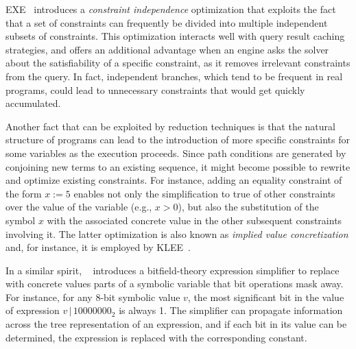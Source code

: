 {\sc EXE}~\cite{EXE-CCS06} introduces a {\em constraint independence} optimization that exploits the fact that a set of constraints can frequently be divided into multiple independent subsets of constraints. This optimization interacts well with query result caching strategies, and offers an additional advantage when an engine asks the solver about the satisfiability of a specific constraint, as it removes irrelevant constraints from the query. In fact, independent branches, which tend to be frequent in real programs, could lead to unnecessary constraints that would get quickly accumulated.

Another fact that can be exploited by reduction techniques is that the natural structure of programs can lead to the introduction of more specific constraints for some variables as the execution proceeds. Since path conditions are generated by conjoining new terms to an existing sequence, it might become possible to rewrite and optimize existing constraints. For instance, adding an equality constraint of the form $x:=5$ enables not only the simplification to true of other constraints over the value of the variable (e.g., $x>0$), but also the substitution of the symbol $x$ with the associated concrete value in the other subsequent constraints involving it. The latter optimization is also known as {\em implied value concretization} and, for instance, it is employed by {\sc KLEE}~\cite{KLEE-OSDI08}.

In a similar spirit, {\sc \stwoe}~\cite{CKC-TOCS12} introduces a bitfield-theory expression simplifier to replace with concrete values parts of a symbolic variable that bit operations mask away. For instance, for any 8-bit symbolic value $v$, the most significant bit in the value of expression $v\,|\,10000000_2$ is always 1. The simplifier can propagate information across the tree representation of an expression, and if each bit in its value can be determined, the expression is replaced with the corresponding constant.
 



